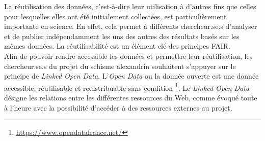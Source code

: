 La réutilisation des données, c'est-à-dire leur utilisation à d’autres fins que celles pour lesquelles elles ont été initialement collectées, est particulièrement importante en science. En effet, cela permet à différents chercheur.se.s d’analyser et de publier indépendamment les uns des autres des résultats basés sur les mêmes données. La réutilisabilité est un élément clé des principes FAIR.\\
Afin de pouvoir rendre accessible les données et permettre leur réutilisation, les chercheur.se.s du projet du schisme alexandrin souhaitent s’appuyer sur le principe de \textit{Linked Open Data}. L’\textit{Open Data} ou la donnée ouverte est une donnée accessible, réutilisable et redistribuable sans condition \footnote{\url{https://www.opendatafrance.net/}}. Le \textit{Linked Open Data} désigne les relations entre les différentes ressources du Web, comme évoqué toute à l’heure avec la possibilité d’accéder à des ressources externes au projet. 
